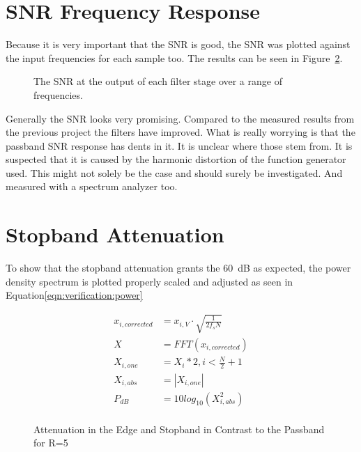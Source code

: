 \section{SNR Frequency Response}
\label{sec:verification:snr}

Because it is very important that the SNR is good, the SNR was plotted against the input frequencies for each sample too.
The results can be seen in Figure~\ref{sec:verification:snr}.

\begin{figure}
    \centering
    
    \caption[The SNR at the output of each filter stage over a range of frequencies.]{%
        The SNR at the output of each filter stage over a range of frequencies.%
    }
    \label{fig:verification:rmsAll}
\end{figure}

Generally the SNR looks very promising. Compared to the measured results from the previous project the filters have improved.
What is really worrying is that the passband SNR response has dents in it.
It is unclear where those stem from. It is suspected that it is caused by the harmonic distortion of the function generator used. This might not solely be the case and should surely be investigated. And measured with a spectrum analyzer too.

\section{Stopband Attenuation}
\label{sec:verification:snr}

To show that the stopband attenuation grants the \SI{60}{\dB} as expected, the power density spectrum is plotted properly scaled and adjusted as seen in Equation\ref{eqn:verification:power}

\begin{align}
    \label{eqn:verification:power}
    x_{i,corrected} &= x_{i,V} \cdot \sqrt{\frac{1}{2f_sN}}\\
    X &= FFT(x_{i,corrected})\\
    X_{i,one} &= X_i * 2, i < \frac{N}{2}+1\\
    X_{i,abs} &= |X_{i,one}|\\
    P_{dB} &= 10log_{10}(X_{i,abs}^2)\\
\end{align}



\begin{figure}
    \centering
    
    \caption[Attenuation in the Edge and Stopband in Contrast to the Passband for R=5]{%
    Attenuation in the Edge and Stopband in Contrast to the Passband for R=5%
    }
    \label{fig:verification:fB5}
\end{figure}

